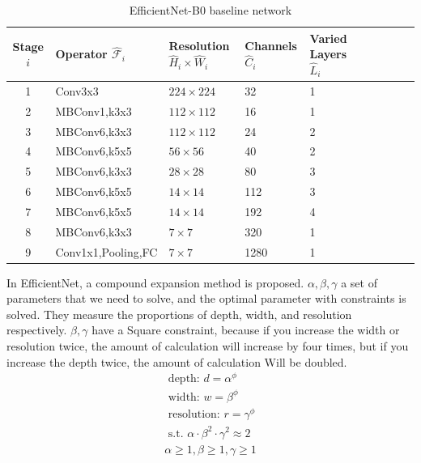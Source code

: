 \documentclass[12pt]{article}
\begin{document}
\begin{table}[H]
	\centering
	\caption{ EfficientNet-B0 baseline network}\label{y}
	\begin{tabularx}{0.9\textwidth}{clllllllll}
		\toprule
		Stage $i$ & Operator $\hat {\mathcal{F}}_{i}$ & Resolution $\hat H_{i} \times \hat W_{i}$ & Channels $\hat C_{i}$ &Varied Layers $\hat L_{i}$  \\
		\midrule
		1 & Conv3x3  &  $224 \times 224$ & 32& 1 \\
		\rowcolor{mygray}
		2 & MBConv1,k3x3  & $112 \times 112$ & 16& 1\\
		3 & MBConv6,k3x3  & $112 \times 112$  &24& 2 \\
		\rowcolor{mygray}
		4 & MBConv6,k5x5 &$56 \times 56$& 40& 2\\
		5 & MBConv6,k3x3  & $28 \times 28$ & 80& 3 \\
		\rowcolor{mygray}
		6 & MBConv6,k5x5 &$14 \times 14$ & 112& 3 \\
		7 & MBConv6,k5x5 & $14 \times 14$  & 192& 4 \\
		\rowcolor{mygray}
		8 & MBConv6,k3x3  &  $7 \times 7$ & 320& 1 \\
		9 & Conv1x1,Pooling,FC  &$7 \times 7$  &1280& 1 \\
		\bottomrule
	\end{tabularx}
\end{table}	

In EfficientNet, a compound expansion method is proposed. $\alpha,\beta,\gamma$ a set of parameters that we need to solve, and the optimal parameter with constraints is solved. They measure the proportions of depth, width, and resolution respectively. $\beta,\gamma$ have a Square constraint, because if you increase the width or resolution twice, the amount of calculation will increase by four times, but if you increase the depth twice, the amount of calculation Will be doubled. 
\begin{equation}
\begin{array}{l}
\text { depth: } d=\alpha^{\phi} \\
\text { width: } w=\beta^{\phi} \\
\text { resolution: } r=\gamma^{\phi} \\
\text { s.t. } \alpha \cdot \beta^{2} \cdot \gamma^{2} \approx 2 \\
\alpha \geq 1, \beta \geq 1, \gamma \geq 1
\end{array}
\end{equation}
\end{document}
